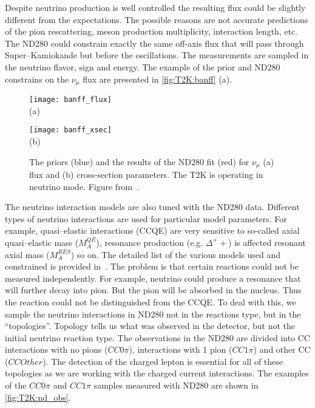 \documentclass[../main.tex]{subfiles}
\begin{document}
Despite neutrino production is well controlled the resulting flux could be slightly different from the expectations. The possible reasons are not accurate predictions of the pion rescattering, meson production multiplicity, interaction length, etc. The ND280 could constrain exactly the same off-axis flux that will pass through Super--Kamiokande but before the oscillations. The measurements are sampled in the neutrino flavor, sign and energy. The example of the prior and ND280 constrains on the $\nu_\mu$ flux are presented in \autoref{fig:T2K:banff} (a). 

\begin{figure}[!ht]
  \centering
  \begin{minipage}{0.49\linewidth}
    \centering
    \texttt{[image: banff\_flux]} \\ (a)
  \end{minipage}
  \begin{minipage}{0.49\linewidth}
    \centering
    \texttt{[image: banff\_xsec]} \\ (b)
  \end{minipage}
    \caption{The priors (blue) and the results of the ND280 fit (red) for $\nu_\mu$ (a) flux and (b) cross-section parameters. The T2K is operating in neutrino mode. Figure from~\cite{Abe2017}.}
    \label{fig:T2K:banff}
\end{figure}

The neutrino interaction models are also tuned with the ND280 data. Different types of neutrino interactions are used for particular model parameters. For example, quasi--elastic interactions (CCQE) are very sensitive to so-called axial quasi--elastic mass ($M^{QE}_A$), resonance production (e.g. $\Delta^++$) is affected resonant axial mass ($M_A^{RES}$) so on. The detailed list of the various models used and constrained is provided in~\cite{Abe2017}. The problem is that certain reactions could not be measured independently. For example, neutrino could produce a resonance that will further decay into pion. But the pion will be absorbed in the nucleus. Thus the reaction could not be distinguished from the CCQE. To deal with this, we sample the neutrino interactions in ND280 not in the reactions type, but in the ``topologies''. Topology tells us what was observed in the detector, but not the initial neutrino reaction type. The observations in the ND280 are divided into CC interactions with no pions ($CC0\pi$), interactions with 1 pion ($CC1\pi$) and other CC ($CCOther$). The detection of the charged lepton is essential for all of these topologies as we are working with the charged current interactions. The examples of the $CC0\pi$ and $CC1\pi$ samples measured with ND280 are shown in \autoref{fig:T2K:nd_obs}. 
\end{document}
